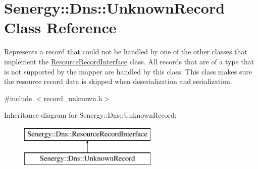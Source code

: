 \hypertarget{class_senergy_1_1_dns_1_1_unknown_record}{\section{Senergy\-:\-:Dns\-:\-:Unknown\-Record Class Reference}
\label{class_senergy_1_1_dns_1_1_unknown_record}
}


Represents a record that could not be handled by one of the other classes that implement the \hyperlink{class_senergy_1_1_dns_1_1_resource_record_interface}{Resource\-Record\-Interface} class. All records that are of a type that is not supported by the mapper are handled by this class. This class makes sure the resource record data is skipped when deserialization and serialization.  




{\ttfamily \#include $<$record\-\_\-unknown.\-h$>$}

Inheritance diagram for Senergy\-:\-:Dns\-:\-:Unknown\-Record\-:\begin{figure}[H]
\begin{center}
\leavevmode
\includegraphics[height=2.000000cm]{class_senergy_1_1_dns_1_1_unknown_record}
\end{center}
\end{figure}
